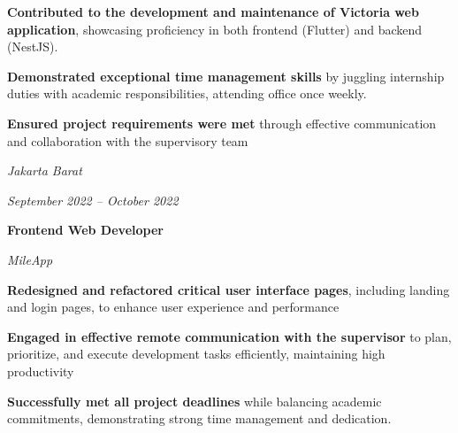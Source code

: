 \documentclass[../main.tex]{subfiles}
\begin{document}
        \vspace{0.10 cm}
        \begin{onecolentry}
            \begin{highlights}
            \item \textbf{Contributed to the development and maintenance of Victoria web application}, showcasing proficiency in both frontend (Flutter) and backend (NestJS).
            \item \textbf{Demonstrated exceptional time management skills} by juggling internship duties with academic responsibilities, attending office once weekly.
            \item \textbf{Ensured project requirements were met} through effective communication and collaboration with the supervisory team
            \end{highlights}
        \end{onecolentry}


        \vspace{0.2 cm}

        \begin{twocolentry}{
            \small
        \textit{Jakarta Barat}    
            
        \textit{September 2022 – October 2022}}
            \textbf{Frontend Web Developer}
            
            \textit{MileApp}
        \end{twocolentry}

        \vspace{0.10 cm}
        \begin{onecolentry}
            \begin{highlights}
            \item \textbf{Redesigned and refactored critical user interface pages}, including landing and login pages, to enhance user experience and performance
            \item \textbf{Engaged in effective remote communication with the supervisor} to plan, prioritize, and execute development tasks efficiently, maintaining high productivity
            \item \textbf{Successfully met all project deadlines} while balancing academic commitments, demonstrating strong time management and dedication.
            \end{highlights}
        \end{onecolentry}

        \vspace{0.2 cm}
\end{document}
